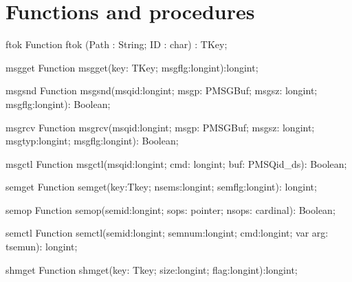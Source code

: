 \section{Functions and procedures}

\begin{function}{ftok}
\Declaration
Function ftok (Path : String; ID : char) : TKey;
\Description
\Errors
\SeeAlso
\end{function}

\begin{function}{msgget}
\Declaration
Function msgget(key: TKey; msgflg:longint):longint;	
\Description
\Errors
\SeeAlso
\end{function}

\begin{function}{msgsnd}
\Declaration
Function msgsnd(msqid:longint; msgp: PMSGBuf; msgsz: longint; msgflg:longint): Boolean;
\Description
\Errors
\SeeAlso
\end{function}

\begin{function}{msgrcv}
\Declaration
Function msgrcv(msqid:longint; msgp: PMSGBuf; msgsz: longint; msgtyp:longint; msgflg:longint): Boolean;
\Description
\Errors
\SeeAlso
\end{function}

\begin{function}{msgctl}
\Declaration
Function msgctl(msqid:longint; cmd: longint; buf: PMSQid\_ds): Boolean;
\Description
\Errors
\SeeAlso
\end{function}

\begin{function}{semget}
\Declaration
Function semget(key:Tkey; nsems:longint; semflg:longint): longint;
\Description
\Errors
\SeeAlso
\end{function}

\begin{function}{semop}
\Declaration
Function semop(semid:longint; sops: pointer; nsops: cardinal): Boolean;
\Description
\Errors
\SeeAlso
\end{function}

\begin{function}{semctl}
\Declaration
Function semctl(semid:longint; semnum:longint; cmd:longint; var arg: tsemun): longint;
\Description
\Errors
\SeeAlso
\end{function}

\begin{function}{shmget}
\Declaration
Function shmget(key: Tkey; size:longint; flag:longint):longint;
\Description
\Errors
\SeeAlso
\end{function}

